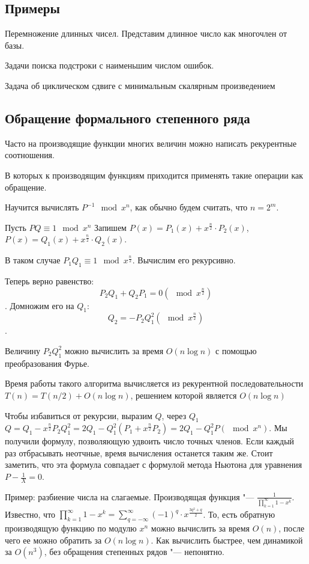 \documentclass[12pt,a4paper]{article}
\theoremstyle{plain}
\begin{document}
\subsection{Примеры}

Перемножение длинных чисел. Представим длинное число как многочлен от базы.

Задачи поиска подстроки с наименьшим числом ошибок.

Задача об циклическом сдвиге с минимальным скалярным произведением

\subsection{Обращение формального степенного ряда}

Часто на производящие функции многих величин можно написать рекурентные соотношения.

В которых к производящим функциям приходится применять такие операции как обращение.

Научится вычислять $P^{-1} \mod x^n$, как обычно будем считать, что $n = 2^m$.

Пусть $P Q \equiv 1 \mod x^n$
Запишем $P(x) = P_1(x) + x^{\frac{n}{2}} \cdot P_2(x)$, $P(x) = Q_1(x) + x^{\frac{n}{2}} \cdot Q_2(x)$.

В таком случае $P_1 Q_1 \equiv 1 \mod x^{\frac{n}{2}}$. Вычислим его рекурсивно.

Теперь верно равенство: $$P_2 Q_1 + Q_2 P_1 = 0 (\mod x^{\frac{n}{2}})$$. 
Домножим его на $Q_1$:
$$Q_2 = - P_2 Q_1^2 (\mod x^{\frac{n}{2}})$$.

Величину $P_2 Q_1 ^2$ можно вычислить за время $O(n\log{n})$ с помощью преобразования Фурье.

Время работы такого алгоритма вычисляется из рекурентной последовательности 
$T(n) = T(n/2) + O(n\log n)$, решением которой является $O(n\log n)$

Чтобы избавиться от рекурсии, выразим $Q$, через $Q_1$
$Q = Q_1 - x^{\frac{n}{2}}P_2Q_1^2 = 2Q_1 - Q_1^2(P_1 + x^{\frac{n}{2}}P_2) = 2Q_1 - Q_1^2 P (\mod x^n)$.
Мы получили формулу, позволяющую удвоить число точных членов. Если каждый раз отбрасывать неотчные,
время вычисления останется таким же. Стоит заметить, что эта формула совпадает с формулой метода Ньютона для уравнения
$P - \frac{1}{X} = 0$. 

Пример: разбиение числа на слагаемые.
Производящая функция "--- $\frac{1}{\prod\limits_{k=1}^{\infty}{1 - x^k}}$.
Известно, что $\prod\limits_{k=1}^{\infty}{1 - x^k} = \sum\limits_{q=-\infty}^{\infty}{(-1)^q\cdot x^{\frac{3q^2+q}{2}}}$.
То, есть обратную производящую функцию по модулю $x^n$ можно вычислить за время $O(n)$, после чего ее можно обратить за $O(n\log n)$.
Как вычислить быстрее, чем динамикой за $O(n^3)$, без обращения степенных рядов "--- непонятно.
\end{document}

